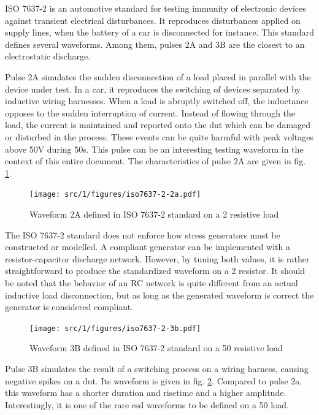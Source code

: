 ISO 7637-2\cite{iso7637-2} is an automotive standard for testing immunity of electronic devices against transient electrical disturbances.
It reproduces disturbances applied on supply lines, when the battery of a car is disconnected for instance.
This standard defines several waveforms.
Among them, pulses 2A and 3B are the closest to an electrostatic discharge.

Pulse 2A simulates the sudden disconnection of a load placed in parallel with the device under test.
In a car, it reproduces the switching of devices separated by inductive wiring harnesses.
When a load is abruptly switched off, the inductance opposes to the sudden interruption of current.
Instead of flowing through the load, the current is maintained and reported onto the \gls{dut} which can be damaged or disturbed in the process.
These events can be quite harmful with peak voltages above 50V during 50\textmu{}s.
This pulse can be an interesting testing waveform in the context of this entire document.
The characteristics of pulse 2A are given in fig. \ref{fig:iso_2a_pulse}.

\begin{figure}[!h]
  \centering
  \texttt{[image: src/1/figures/iso7637-2-2a.pdf]}
  \caption{Waveform 2A defined in ISO 7637-2 standard on a 2\textOmega{} resistive load}
  \label{fig:iso_2a_pulse}
\end{figure}

The ISO 7637-2 standard does not enforce how stress generators must be constructed or modelled.
A compliant generator can be implemented with a resistor-capacitor discharge network.
However, by tuning both values, it is rather straightforward to produce the standardized waveform on a 2\textOmega{} resistor.
It should be noted that the behavior of an RC network is quite different from an actual inductive load disconnection, but as long as the generated waveform is correct the generator is considered compliant.

\begin{figure}[!h]
  \centering
  \texttt{[image: src/1/figures/iso7637-2-3b.pdf]}
  \caption{Waveform 3B defined in ISO 7637-2 standard on a 50\textOmega{} resistive load}
  \label{fig:iso_2b_pulse}
\end{figure}

Pulse 3B simulates the result of a switching process on a wiring harness, causing negative spikes on a \gls{dut}.
Its waveform is given in fig. \ref{fig:iso_2b_pulse}.
Compared to pulse 2a, this waveform has a shorter duration and risetime and a higher amplitude.
Interestingly, it is one of the rare \gls{esd} waveforms to be defined on a 50\textOmega{} load.

